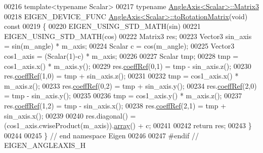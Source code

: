 \begin{DoxyCode}
00216 \textcolor{keyword}{template}<\textcolor{keyword}{typename} Scalar>
00217 \textcolor{keyword}{typename} \hyperlink{group___core___module_class_eigen_1_1_matrix}{AngleAxis<Scalar>::Matrix3}
00218 EIGEN\_DEVICE\_FUNC \hyperlink{group___geometry___module_a750ae6694e576bc6c49b635b56ef5306}{AngleAxis<Scalar>::toRotationMatrix}(\textcolor{keywordtype}{void})\textcolor{keyword}{ const}
00219 \textcolor{keyword}{}\{
00220   EIGEN\_USING\_STD\_MATH(sin)
00221   EIGEN\_USING\_STD\_MATH(cos)
00222   Matrix3 res;
00223   Vector3 sin\_axis  = sin(m\_angle) * m\_axis;
00224   Scalar c = cos(m\_angle);
00225   Vector3 cos1\_axis = (Scalar(1)-c) * m\_axis;
00226 
00227   Scalar tmp;
00228   tmp = cos1\_axis.x() * m\_axis.y();
00229   res.\hyperlink{class_eigen_1_1_plain_object_base_a25626a55b26a4323565f79d1b7c48ea8}{coeffRef}(0,1) = tmp - sin\_axis.z();
00230   res.\hyperlink{class_eigen_1_1_plain_object_base_a25626a55b26a4323565f79d1b7c48ea8}{coeffRef}(1,0) = tmp + sin\_axis.z();
00231 
00232   tmp = cos1\_axis.x() * m\_axis.z();
00233   res.\hyperlink{class_eigen_1_1_plain_object_base_a25626a55b26a4323565f79d1b7c48ea8}{coeffRef}(0,2) = tmp + sin\_axis.y();
00234   res.\hyperlink{class_eigen_1_1_plain_object_base_a25626a55b26a4323565f79d1b7c48ea8}{coeffRef}(2,0) = tmp - sin\_axis.y();
00235 
00236   tmp = cos1\_axis.y() * m\_axis.z();
00237   res.\hyperlink{class_eigen_1_1_plain_object_base_a25626a55b26a4323565f79d1b7c48ea8}{coeffRef}(1,2) = tmp - sin\_axis.x();
00238   res.\hyperlink{class_eigen_1_1_plain_object_base_a25626a55b26a4323565f79d1b7c48ea8}{coeffRef}(2,1) = tmp + sin\_axis.x();
00239 
00240   res.diagonal() = (cos1\_axis.cwiseProduct(m\_axis)).\hyperlink{class_eigen_1_1array}{array}() + c;
00241 
00242   \textcolor{keywordflow}{return} res;
00243 \}
00244 
00245 \} \textcolor{comment}{// end namespace Eigen}
00246 
00247 \textcolor{preprocessor}{#endif // EIGEN\_ANGLEAXIS\_H}
\end{DoxyCode}
